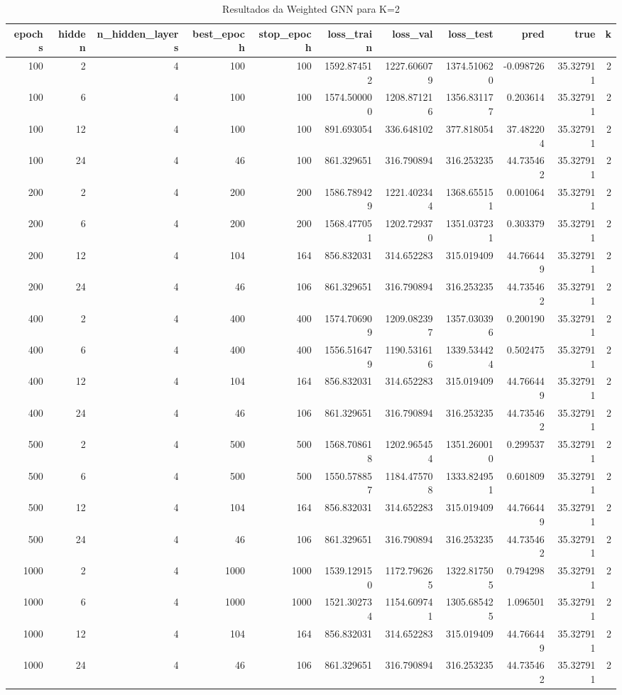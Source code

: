 \begin{table}
\caption{Resultados da Weighted GNN para K=2}
\label{tab:weighted_gnn_results_k2}
\begin{tabular}{rrrrrrrrrrr}
\toprule
epochs & hidden & n\_hidden\_layers & best\_epoch & stop\_epoch & loss\_train & loss\_val & loss\_test & pred & true & k \\
\midrule
100 & 2 & 4 & 100 & 100 & 1592.874512 & 1227.606079 & 1374.510620 & -0.098726 & 35.327911 & 2 \\
100 & 6 & 4 & 100 & 100 & 1574.500000 & 1208.871216 & 1356.831177 & 0.203614 & 35.327911 & 2 \\
100 & 12 & 4 & 100 & 100 & 891.693054 & 336.648102 & 377.818054 & 37.482204 & 35.327911 & 2 \\
100 & 24 & 4 & 46 & 100 & 861.329651 & 316.790894 & 316.253235 & 44.735462 & 35.327911 & 2 \\
200 & 2 & 4 & 200 & 200 & 1586.789429 & 1221.402344 & 1368.655151 & 0.001064 & 35.327911 & 2 \\
200 & 6 & 4 & 200 & 200 & 1568.477051 & 1202.729370 & 1351.037231 & 0.303379 & 35.327911 & 2 \\
200 & 12 & 4 & 104 & 164 & 856.832031 & 314.652283 & 315.019409 & 44.766449 & 35.327911 & 2 \\
200 & 24 & 4 & 46 & 106 & 861.329651 & 316.790894 & 316.253235 & 44.735462 & 35.327911 & 2 \\
400 & 2 & 4 & 400 & 400 & 1574.706909 & 1209.082397 & 1357.030396 & 0.200190 & 35.327911 & 2 \\
400 & 6 & 4 & 400 & 400 & 1556.516479 & 1190.531616 & 1339.534424 & 0.502475 & 35.327911 & 2 \\
400 & 12 & 4 & 104 & 164 & 856.832031 & 314.652283 & 315.019409 & 44.766449 & 35.327911 & 2 \\
400 & 24 & 4 & 46 & 106 & 861.329651 & 316.790894 & 316.253235 & 44.735462 & 35.327911 & 2 \\
500 & 2 & 4 & 500 & 500 & 1568.708618 & 1202.965454 & 1351.260010 & 0.299537 & 35.327911 & 2 \\
500 & 6 & 4 & 500 & 500 & 1550.578857 & 1184.475708 & 1333.824951 & 0.601809 & 35.327911 & 2 \\
500 & 12 & 4 & 104 & 164 & 856.832031 & 314.652283 & 315.019409 & 44.766449 & 35.327911 & 2 \\
500 & 24 & 4 & 46 & 106 & 861.329651 & 316.790894 & 316.253235 & 44.735462 & 35.327911 & 2 \\
1000 & 2 & 4 & 1000 & 1000 & 1539.129150 & 1172.796265 & 1322.817505 & 0.794298 & 35.327911 & 2 \\
1000 & 6 & 4 & 1000 & 1000 & 1521.302734 & 1154.609741 & 1305.685425 & 1.096501 & 35.327911 & 2 \\
1000 & 12 & 4 & 104 & 164 & 856.832031 & 314.652283 & 315.019409 & 44.766449 & 35.327911 & 2 \\
1000 & 24 & 4 & 46 & 106 & 861.329651 & 316.790894 & 316.253235 & 44.735462 & 35.327911 & 2 \\
\bottomrule
\end{tabular}
\end{table}
